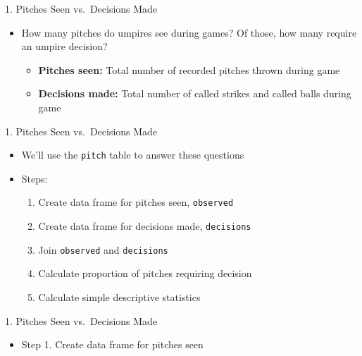 \begin{frame}{1. Pitches Seen vs.~Decisions Made}

\begin{itemize}
\tightlist
\item
  How many pitches do umpires see during games? Of those, how many
  require an umpire decision?

  \begin{itemize}
  \tightlist
  \item
    \textbf{Pitches seen:} Total number of recorded pitches thrown
    during game
  \item
    \textbf{Decisions made:} Total number of called strikes and called
    balls during game
  \end{itemize}
\end{itemize}

\end{frame}

\begin{frame}[fragile]{1. Pitches Seen vs.~Decisions Made}

\begin{itemize}
\tightlist
\item
  We'll use the \texttt{pitch} table to answer these questions
\item
  Steps:

  \begin{enumerate}
  \def\labelenumi{\arabic{enumi}.}
  \tightlist
  \item
    Create data frame for pitches seen, \texttt{observed}
  \item
    Create data frame for decisions made, \texttt{decisions}
  \item
    Join \texttt{observed} and \texttt{decisions}
  \item
    Calculate proportion of pitches requiring decision
  \item
    Calculate simple descriptive statistics
  \end{enumerate}
\end{itemize}

\end{frame}

\begin{frame}[fragile]{1. Pitches Seen vs.~Decisions Made}

\begin{itemize}
\tightlist
\item
  Step 1. Create data frame for pitches seen
\end{itemize}

\footnotesize

\begin{Shaded}
\end{Shaded}

\end{frame}

